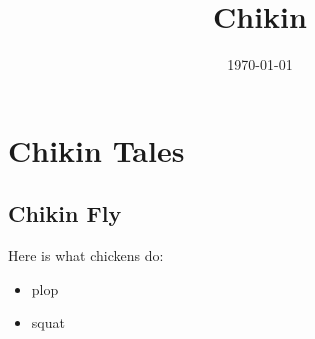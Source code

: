     
    \title{Chikin}
    \date{\today}
    \section
    [Tales]{Chikin Tales}
    \subsection
    {Chikin Fly}

    Here is what chickens do:

    \begin{itemize}
    \item plop
    \item squat
    \end{itemize}
    
